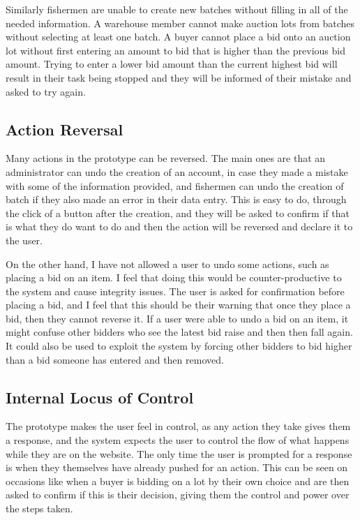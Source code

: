 \documentclass{article}
\begin{document}
Similarly fishermen are unable to create new batches without filling in all of the needed information. A warehouse member cannot make auction lots from batches without selecting at least one batch. A buyer cannot place a bid onto an auction lot without first entering an amount to bid that is higher than the previous bid amount. Trying to enter a lower bid amount than the current highest bid will result in their task being stopped and they will be informed of their mistake and asked to try again.

\subsection{Action Reversal}
Many actions in the prototype can be reversed. The main ones are that an administrator can undo the creation of an account, in case they made a mistake with some of the information provided, and fishermen can undo the creation of batch if they also made an error in their data entry. This is easy to do, through the click of a button after the creation, and they will be asked to confirm if that is what they do want to do and then the action will be reversed and declare it to the user.

On the other hand, I have not allowed a user to undo some actions, such as placing a bid on an item. I feel that doing this would be counter-productive to the system and cause integrity issues.  The user is asked for confirmation before placing a bid, and I feel that this should be their warning that once they place a bid, then they cannot reverse it. If a user were able to undo a bid on an item, it might confuse other bidders who see the latest bid raise and then then fall again. It could also be used to exploit the system by forcing other bidders to bid higher than a bid someone has entered and then removed.

\subsection{Internal Locus of Control}
The prototype makes the user feel in control, as any action they take gives them a response, and the system expects the user to control the flow of what happens while they are on the website. The only time the user is prompted for a response is when they themselves have already pushed for an action. This can be seen on occasions like when a buyer is bidding on a lot by their own choice and are then asked to confirm if this is their decision, giving them the control and power over the steps taken.
\end{document}
